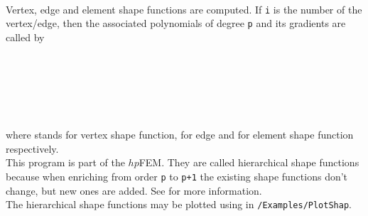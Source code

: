  \\

 Vertex, edge and element shape functions are computed. If {\tt i} is the number of the vertex/edge, then the associated polynomials of degree {\tt p} and its gradients are called by \\

 \\
 \\
 \\
 \\
 \\
 \\

 where  stands for vertex shape function,  for edge and  for element shape function respectively. \\

 This program is part of the $hp$FEM. They are called hierarchical shape functions because when enriching from order {\tt p} to {\tt p+1} the existing shape functions don't change, but new ones are added. See \cite{AI03} for more information. \\

 The hierarchical shape functions may be plotted using  in {\tt /Examples/PlotShap}.


